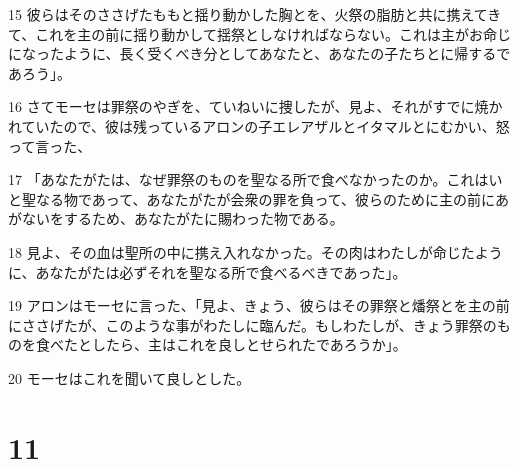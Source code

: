 \par 15 彼らはそのささげたももと揺り動かした胸とを、火祭の脂肪と共に携えてきて、これを主の前に揺り動かして揺祭としなければならない。これは主がお命じになったように、長く受くべき分としてあなたと、あなたの子たちとに帰するであろう」。
\par 16 さてモーセは罪祭のやぎを、ていねいに捜したが、見よ、それがすでに焼かれていたので、彼は残っているアロンの子エレアザルとイタマルとにむかい、怒って言った、
\par 17 「あなたがたは、なぜ罪祭のものを聖なる所で食べなかったのか。これはいと聖なる物であって、あなたがたが会衆の罪を負って、彼らのために主の前にあがないをするため、あなたがたに賜わった物である。
\par 18 見よ、その血は聖所の中に携え入れなかった。その肉はわたしが命じたように、あなたがたは必ずそれを聖なる所で食べるべきであった」。
\par 19 アロンはモーセに言った、「見よ、きょう、彼らはその罪祭と燔祭とを主の前にささげたが、このような事がわたしに臨んだ。もしわたしが、きょう罪祭のものを食べたとしたら、主はこれを良しとせられたであろうか」。
\par 20 モーセはこれを聞いて良しとした。

\chapter{11}

